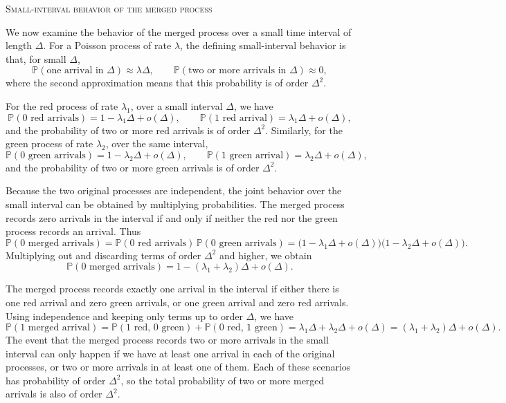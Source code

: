 \bigskip
\textsc{Small-interval behavior of the merged process}

We now examine the behavior of the merged process over a small time interval of length \(\Delta\).  
For a Poisson process of rate \(\lambda\), the defining small-interval behavior is that, for small \(\Delta\),
\[
\mathbb{P}(\text{one arrival in } \Delta) \approx \lambda \Delta,
\qquad
\mathbb{P}(\text{two or more arrivals in } \Delta) \approx 0,
\]
where the second approximation means that this probability is of order \(\Delta^2\).  

For the red process of rate \(\lambda_1\), over a small interval \(\Delta\), we have
\[
\mathbb{P}(\text{0 red arrivals}) = 1 - \lambda_1 \Delta + o(\Delta),
\qquad
\mathbb{P}(\text{1 red arrival}) = \lambda_1 \Delta + o(\Delta),
\]
and the probability of two or more red arrivals is of order \(\Delta^2\).  
Similarly, for the green process of rate \(\lambda_2\), over the same interval,
\[
\mathbb{P}(\text{0 green arrivals}) = 1 - \lambda_2 \Delta + o(\Delta),
\qquad
\mathbb{P}(\text{1 green arrival}) = \lambda_2 \Delta + o(\Delta),
\]
and the probability of two or more green arrivals is of order \(\Delta^2\).  

Because the two original processes are independent, the joint behavior over the small interval can be obtained by multiplying probabilities.  
The merged process records zero arrivals in the interval if and only if neither the red nor the green process records an arrival.  
Thus
\[
\mathbb{P}(\text{0 merged arrivals})
=
\mathbb{P}(\text{0 red arrivals}) \,\mathbb{P}(\text{0 green arrivals})
=
\big(1 - \lambda_1 \Delta + o(\Delta)\big)\big(1 - \lambda_2 \Delta + o(\Delta)\big).
\]
Multiplying out and discarding terms of order \(\Delta^2\) and higher, we obtain
\[
\mathbb{P}(\text{0 merged arrivals})
=
1 - (\lambda_1 + \lambda_2)\Delta + o(\Delta).
\]

The merged process records exactly one arrival in the interval if either there is one red arrival and zero green arrivals, or one green arrival and zero red arrivals.  
Using independence and keeping only terms up to order \(\Delta\), we have
\[
\mathbb{P}(\text{1 merged arrival})
=
\mathbb{P}(\text{1 red, 0 green})
+
\mathbb{P}(\text{0 red, 1 green})
=
\lambda_1 \Delta + \lambda_2 \Delta + o(\Delta)
=
(\lambda_1 + \lambda_2)\Delta + o(\Delta).
\]
The event that the merged process records two or more arrivals in the small interval can only happen if we have at least one arrival in each of the original processes, or two or more arrivals in at least one of them.  
Each of these scenarios has probability of order \(\Delta^2\), so the total probability of two or more merged arrivals is also of order \(\Delta^2\).  

